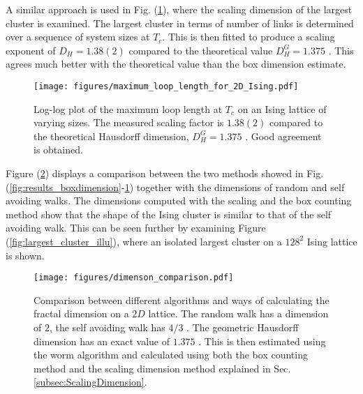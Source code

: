 \newpage

A similar approach is used in Fig. (\ref{fig:results_maxloopdimension}), where the scaling dimension of the largest cluster is examined. The largest cluster in terms of number of links is determined over a sequence of system sizes at $T_c$. This is then fitted to produce a scaling exponent of $D_H = 1.38(2)$ compared to the theoretical value $D_H^G = 1.375$ \cite{Duplantier:GeoHausdorff}. This agrees much better with the theoretical value than the box dimension estimate. 

\begin{figure}[h!]
    \centering
        \texttt{[image: figures/maximum\_loop\_length\_for\_2D\_Ising.pdf]}
    \caption{Log-log plot of the maximum loop length at $T_c$ on an Ising lattice of varying sizes. The measured scaling factor is $1.38(2)$ compared to the theoretical Hausdorff dimension, $D_H^G = 1.375$ \cite{Duplantier:GeoHausdorff}. Good agreement is obtained.}
    \label{fig:results_maxloopdimension}
\end{figure}

\newpage

Figure (\ref{fig:comparsion_2d_lattice_dimensions}) displays a comparison between the two methods showed in Fig. (\ref{fig:results_boxdimension}-\ref{fig:results_maxloopdimension}) together with the dimensions of random and self avoiding walks. The dimensions computed with the scaling and the box counting method show that the shape of the Ising cluster is similar to that of the self avoiding walk. This can be seen further by examining Figure (\ref{fig:largest_cluster_illu}), where an isolated largest cluster on a $128^2$ Ising lattice is shown.

\begin{figure}[h!]
    \centering
        \texttt{[image: figures/dimenson\_comparison.pdf]}
    \caption{Comparison between different algorithms and ways of calculating the fractal dimension on a $2D$ lattice. The random walk has a dimension of $2$, the self avoiding walk has $4/3$ \cite{Vilgis:FlorySAW}. The geometric Hausdorff dimension has an exact value of $1.375$ \cite{Duplantier:GeoHausdorff}. This is then estimated using the worm algorithm and calculated using both the box counting method and the scaling dimension method explained in Sec. \ref{subsec:ScalingDimension}.}
    \label{fig:comparsion_2d_lattice_dimensions}
\end{figure}

\newpage


